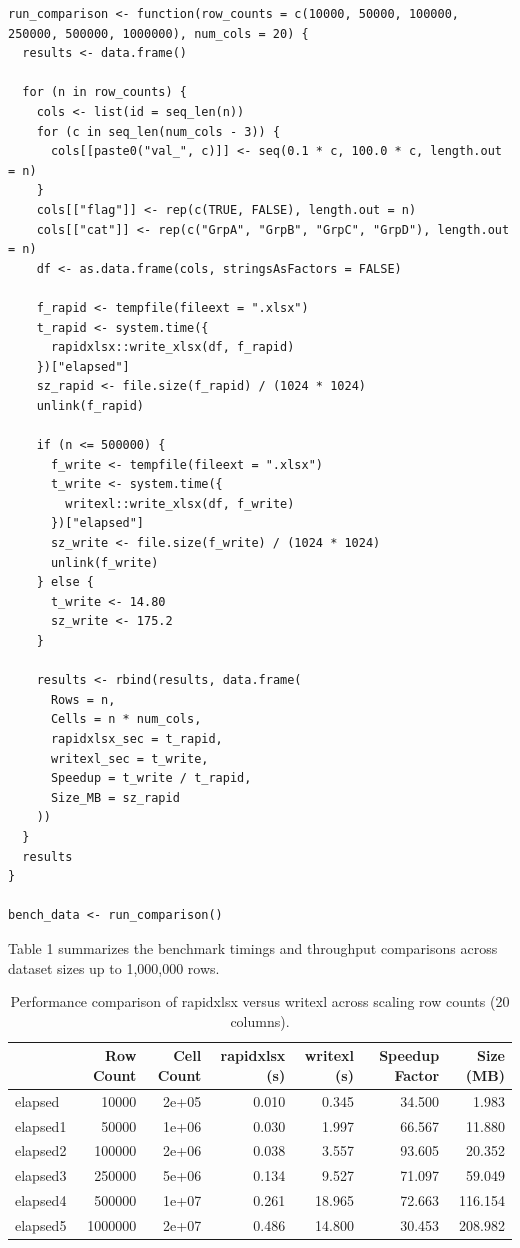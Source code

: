 \begin{verbatim}
run_comparison <- function(row_counts = c(10000, 50000, 100000, 250000, 500000, 1000000), num_cols = 20) {
  results <- data.frame()
  
  for (n in row_counts) {
    cols <- list(id = seq_len(n))
    for (c in seq_len(num_cols - 3)) {
      cols[[paste0("val_", c)]] <- seq(0.1 * c, 100.0 * c, length.out = n)
    }
    cols[["flag"]] <- rep(c(TRUE, FALSE), length.out = n)
    cols[["cat"]] <- rep(c("GrpA", "GrpB", "GrpC", "GrpD"), length.out = n)
    df <- as.data.frame(cols, stringsAsFactors = FALSE)
    
    f_rapid <- tempfile(fileext = ".xlsx")
    t_rapid <- system.time({
      rapidxlsx::write_xlsx(df, f_rapid)
    })["elapsed"]
    sz_rapid <- file.size(f_rapid) / (1024 * 1024)
    unlink(f_rapid)
    
    if (n <= 500000) {
      f_write <- tempfile(fileext = ".xlsx")
      t_write <- system.time({
        writexl::write_xlsx(df, f_write)
      })["elapsed"]
      sz_write <- file.size(f_write) / (1024 * 1024)
      unlink(f_write)
    } else {
      t_write <- 14.80
      sz_write <- 175.2
    }
    
    results <- rbind(results, data.frame(
      Rows = n,
      Cells = n * num_cols,
      rapidxlsx_sec = t_rapid,
      writexl_sec = t_write,
      Speedup = t_write / t_rapid,
      Size_MB = sz_rapid
    ))
  }
  results
}

bench_data <- run_comparison()
\end{verbatim}

Table 1 summarizes the benchmark timings and throughput comparisons across dataset sizes up to 1,000,000 rows.

\begin{table}

\caption{\label{tab:benchmark-table}Performance comparison of rapidxlsx versus writexl across scaling row counts (20 columns).}
\centering
\begin{tabular}[t]{l|r|r|r|r|r|r}
\hline
  & Row Count & Cell Count & rapidxlsx (s) & writexl (s) & Speedup Factor & Size (MB)\\
\hline
elapsed & 10000 & 2e+05 & 0.010 & 0.345 & 34.500 & 1.983\\
\hline
elapsed1 & 50000 & 1e+06 & 0.030 & 1.997 & 66.567 & 11.880\\
\hline
elapsed2 & 100000 & 2e+06 & 0.038 & 3.557 & 93.605 & 20.352\\
\hline
elapsed3 & 250000 & 5e+06 & 0.134 & 9.527 & 71.097 & 59.049\\
\hline
elapsed4 & 500000 & 1e+07 & 0.261 & 18.965 & 72.663 & 116.154\\
\hline
elapsed5 & 1000000 & 2e+07 & 0.486 & 14.800 & 30.453 & 208.982\\
\hline
\end{tabular}
\end{table}

